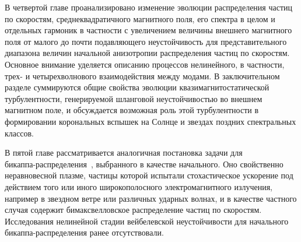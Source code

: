 В четвертой главе проанализировано  изменение эволюции распределения частиц по скоростям, среднеквадратичного магнитного поля, его спектра в целом и отдельных гармоник в частности с увеличением величины внешнего магнитного поля от малого до почти подавляющего неустойчивость для представительного диапазона величин начальной анизотропии распределения частиц по скоростям. Основное внимание уделяется описанию  процессов нелинейного, в частности, трех- и четырехволнового взаимодействия между модами. В заключительном разделе суммируются общие свойства эволюции квазимагнитостатической турбулентности, генерируемой шланговой неустойчивостью во внешнем магнитном поле, и обсуждается возможная роль этой турбулентности в формировании корональных вспышек на Солнце и звездах поздних спектральных классов.

В пятой главе рассматривается аналогичная постановка задачи для\\ бикаппа-распределения~\cite{Livadiotis2017, Livadiotis2021}, выбранного в качестве начального. Оно свойственно неравновесной плазме, частицы которой испытали стохастическое ускорение под действием того или иного широкополосного электромагнитного излучения, например в звездном ветре или различных ударных волнах, и в качестве частного случая содержит бимаксвелловское распределение частиц по скоростям. Исследования нелинейной стадии вейбелевской неустойчивости для начального бикаппа-распределения ранее отсутствовали.




